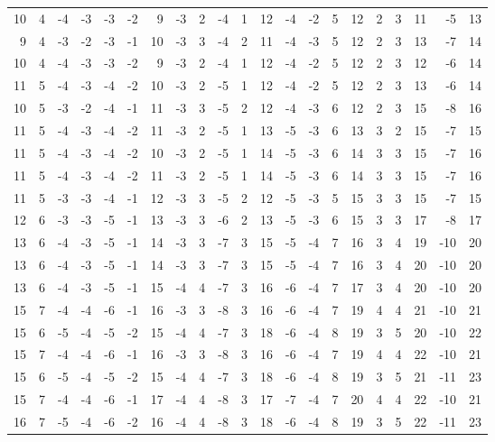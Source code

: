 \begin{center}
\begin{tabular}{*{21}{r}}
10 & 4 & -4 & -3 & -3 & -2 & 9 & -3 & 2 & -4 & 1 & 12 & -4 & -2 & 5 & 12 & 2 & 3 & 11 & -5 & 13 \\
9 & 4 & -3 & -2 & -3 & -1 & 10 & -3 & 3 & -4 & 2 & 11 & -4 & -3 & 5 & 12 & 2 & 3 & 13 & -7 & 14 \\
10 & 4 & -4 & -3 & -3 & -2 & 9 & -3 & 2 & -4 & 1 & 12 & -4 & -2 & 5 & 12 & 2 & 3 & 12 & -6 & 14 \\
11 & 5 & -4 & -3 & -4 & -2 & 10 & -3 & 2 & -5 & 1 & 12 & -4 & -2 & 5 & 12 & 2 & 3 & 13 & -6 & 14 \\
10 & 5 & -3 & -2 & -4 & -1 & 11 & -3 & 3 & -5 & 2 & 12 & -4 & -3 & 6 & 12 & 2 & 3 & 15 & -8 & 16 \\
11 & 5 & -4 & -3 & -4 & -2 & 11 & -3 & 2 & -5 & 1 & 13 & -5 & -3 & 6 & 13 & 3 & 2 & 15 & -7 & 15 \\
11 & 5 & -4 & -3 & -4 & -2 & 10 & -3 & 2 & -5 & 1 & 14 & -5 & -3 & 6 & 14 & 3 & 3 & 15 & -7 & 16 \\
11 & 5 & -4 & -3 & -4 & -2 & 11 & -3 & 2 & -5 & 1 & 14 & -5 & -3 & 6 & 14 & 3 & 3 & 15 & -7 & 16 \\
11 & 5 & -3 & -3 & -4 & -1 & 12 & -3 & 3 & -5 & 2 & 12 & -5 & -3 & 5 & 15 & 3 & 3 & 15 & -7 & 15 \\
12 & 6 & -3 & -3 & -5 & -1 & 13 & -3 & 3 & -6 & 2 & 13 & -5 & -3 & 6 & 15 & 3 & 3 & 17 & -8 & 17 \\
13 & 6 & -4 & -3 & -5 & -1 & 14 & -3 & 3 & -7 & 3 & 15 & -5 & -4 & 7 & 16 & 3 & 4 & 19 & -10 & 20 \\
13 & 6 & -4 & -3 & -5 & -1 & 14 & -3 & 3 & -7 & 3 & 15 & -5 & -4 & 7 & 16 & 3 & 4 & 20 & -10 & 20 \\
13 & 6 & -4 & -3 & -5 & -1 & 15 & -4 & 4 & -7 & 3 & 16 & -6 & -4 & 7 & 17 & 3 & 4 & 20 & -10 & 20 \\
15 & 7 & -4 & -4 & -6 & -1 & 16 & -3 & 3 & -8 & 3 & 16 & -6 & -4 & 7 & 19 & 4 & 4 & 21 & -10 & 21 \\
15 & 6 & -5 & -4 & -5 & -2 & 15 & -4 & 4 & -7 & 3 & 18 & -6 & -4 & 8 & 19 & 3 & 5 & 20 & -10 & 22 \\
15 & 7 & -4 & -4 & -6 & -1 & 16 & -3 & 3 & -8 & 3 & 16 & -6 & -4 & 7 & 19 & 4 & 4 & 22 & -10 & 21 \\
15 & 6 & -5 & -4 & -5 & -2 & 15 & -4 & 4 & -7 & 3 & 18 & -6 & -4 & 8 & 19 & 3 & 5 & 21 & -11 & 23 \\
15 & 7 & -4 & -4 & -6 & -1 & 17 & -4 & 4 & -8 & 3 & 17 & -7 & -4 & 7 & 20 & 4 & 4 & 22 & -10 & 21 \\
16 & 7 & -5 & -4 & -6 & -2 & 16 & -4 & 4 & -8 & 3 & 18 & -6 & -4 & 8 & 19 & 3 & 5 & 22 & -11 & 23 \\

\end{tabular}
\end{center}
